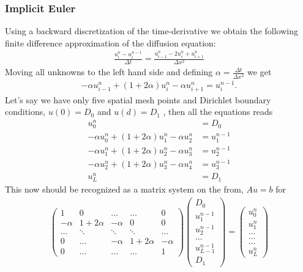 \documentclass[11pt,a4paper,draft]{article}
\numberwithin{equation}{section}
\begin{document}
\subsubsection{Implicit Euler}
\label{subsubsec:implicit_euler}

Using a backward discretization of the time-derivative we obtain the following finite difference approximation of the diffusion equation:
\begin{align}
\frac{u_{i}^{n}-u_{i}^{n-1}}{\Delta t} = \frac{u_{i-1}^{n}-2u_{i}^{n}+u_{i+1}^{n}}{\Delta x^2}
\end{align}
Moving all unknowns to the left hand side and defining $\alpha = \frac{\Delta t}{\Delta x^2}$ we get
\begin{align*}
-\alpha u_{i-1}^n + (1+2\alpha)u_i^n - \alpha u_{i+1}^n = u_i^{n-1}. 
\end{align*}
Let's say we have only five spatial mesh points and Dirichlet boundary conditions, $u(0)=D_0$ and $u(d)=D_1$ , then all the equations reads
\begin{align*}
u_0^n &= D_0 \\
-\alpha u_{0}^n + (1+2\alpha)u_1^n - \alpha u_{2}^n &= u_1^{n-1} \\
-\alpha u_{1}^n + (1+2\alpha)u_2^n - \alpha u_{3}^n &= u_2^{n-1} \\
-\alpha u_{2}^n + (1+2\alpha)u_3^n - \alpha u_{4}^n &= u_3^{n-1} \\
u_L^n &= D_1 
\end{align*}
This now should be recognized as a matrix system on the from, $Au=b$ for 
\begin{align}
\begin{pmatrix} 1 & 0 & \dots   & \dots         & 0 \\
                -\alpha & 1+2\alpha & -\alpha & 0           &0 \\
        \dots  & \ddots & \ddots & \ddots         & \dots\\
 0   & \dots &  -\alpha & 1+2\alpha & -\alpha \\
 0   & \dots & \dots & \dots    &  1
             \end{pmatrix}
\begin{pmatrix} D_0 \\
      u_1^{n-1} \\
      u_2^{n-1}\\ \dots\\ u_{L-1}^{n-1}\\
      D_1
\end{pmatrix} 
=  \begin{pmatrix} u_0^n \\
                   u_1^n  \\
           \dots\\ \dots\\ \dots\\
                   u_L^n 
             \end{pmatrix} 
\end{align} 
\end{document}
